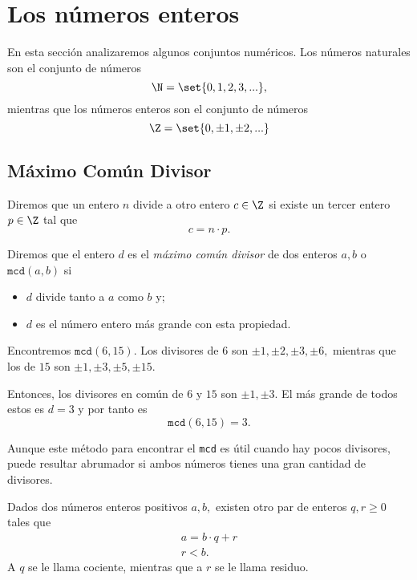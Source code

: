 \section{Los números enteros}
	
	En esta sección analizaremos algunos conjuntos numéricos. 
	Los números naturales son el conjunto de números
	$$
	\N=\set{0,1,2,3,...},
	$$	
	mientras que los números enteros son el conjunto de números
	$$
	\Z=\set{0, \pm1, \pm2,...}	$$	


\subsection{Máximo Común Divisor}
	
\begin{definicion}
	Diremos que un entero $n$ divide a otro entero $c\in \Z$ si existe un tercer entero $p\in \Z$ tal que 
	$$c=n\cdot p.$$
\end{definicion}

\begin{definicion}
	\label{mcd} 
	Diremos que el entero $d$ es el \emph{máximo común divisor} de dos enteros $a,b$ o $\texttt{mcd}(a,b)$  si
	\begin{itemize}
		\item $d$ divide tanto a $a$ como $b$ y;
		\item $d$ es el número entero más grande con esta propiedad.
	\end{itemize}
\end{definicion}

	\begin{ejemplo}
		\label{exmp:mcd}
		Encontremos $\texttt{mcd}(6,15).$ Los divisores de $6$ son $\pm1, \pm2, \pm3, \pm6,$ mientras que los de $15$ son $\pm1, \pm3, \pm5, \pm15.$
		
		Entonces, los divisores en común de $6$ y $15$ son $\pm1,\pm3.$ El más grande de todos estos es 
		$d=3$ y por tanto es $$ \texttt{mcd}(6,15)=3. $$
	\end{ejemplo}
	
 	Aunque este m\'etodo para encontrar el \texttt{mcd} es útil cuando hay pocos divisores, puede resultar abrumador si  	ambos números tienes una gran cantidad de divisores. 
   
	\begin{proposicion}
		Dados dos números enteros positivos $a,b,$ existen otro par de enteros $q, r\geq 0$ tales que
		\begin{align}
			\label{cociente}
			a=b\cdot q+r\\
			\label{residuo}
			r<b.
		\end{align}
		A $q$ se le llama cociente, mientras que a $r$ se le llama residuo.
	\end{proposicion}




